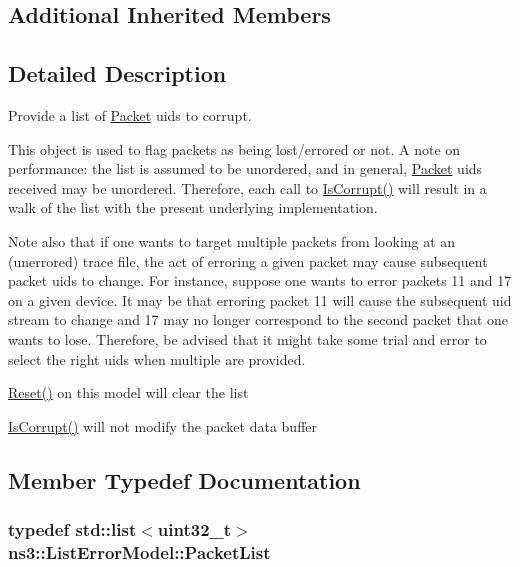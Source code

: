 \subsection*{Additional Inherited Members}


\subsection{Detailed Description}
Provide a list of \hyperlink{classns3_1_1Packet}{Packet} uids to corrupt. 

This object is used to flag packets as being lost/errored or not. A note on performance\+: the list is assumed to be unordered, and in general, \hyperlink{classns3_1_1Packet}{Packet} uids received may be unordered. Therefore, each call to \hyperlink{classns3_1_1ErrorModel_af75222d384e342b46d0aed09d5e3a3fd}{Is\+Corrupt()} will result in a walk of the list with the present underlying implementation.

Note also that if one wants to target multiple packets from looking at an (unerrored) trace file, the act of erroring a given packet may cause subsequent packet uids to change. For instance, suppose one wants to error packets 11 and 17 on a given device. It may be that erroring packet 11 will cause the subsequent uid stream to change and 17 may no longer correspond to the second packet that one wants to lose. Therefore, be advised that it might take some trial and error to select the right uids when multiple are provided.

\hyperlink{classns3_1_1ErrorModel_a6b7cbe56c27562e5ba6daf2f04bcd282}{Reset()} on this model will clear the list

\hyperlink{classns3_1_1ErrorModel_af75222d384e342b46d0aed09d5e3a3fd}{Is\+Corrupt()} will not modify the packet data buffer 

\subsection{Member Typedef Documentation}
\subsubsection[{\texorpdfstring{Packet\+List}{PacketList}}]{\setlength{\rightskip}{0pt plus 5cm}typedef {\bf std\+::list}$<$uint32\+\_\+t$>$ {\bf ns3\+::\+List\+Error\+Model\+::\+Packet\+List}\hspace{0.3cm}{\ttfamily [private]}}\hypertarget{classns3_1_1ListErrorModel_adbaa9f470c317e60540f521b7b40b309}{}\label{classns3_1_1ListErrorModel_adbaa9f470c317e60540f521b7b40b309}


